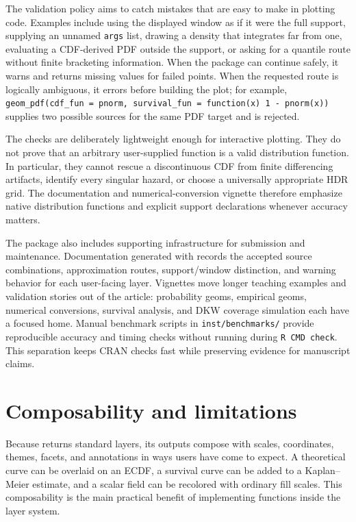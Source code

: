 The validation policy aims to catch mistakes that are easy to make in plotting
code. Examples include using the displayed window as if it were the full
support, supplying an unnamed \texttt{args} list, drawing a density that integrates far
from one, evaluating a CDF-derived PDF outside the support, or asking for a
quantile route without finite bracketing information. When the package can
continue safely, it warns and returns missing values for failed points. When
the requested route is logically ambiguous, it errors before building the plot;
for example, \texttt{geom\_pdf(cdf\_fun\ =\ pnorm,\ survival\_fun\ =\ function(x)\ 1\ -\ pnorm(x))}
supplies two possible sources for the same PDF target and is rejected.

The checks are deliberately lightweight enough for interactive plotting. They
do not prove that an arbitrary user-supplied function is a valid distribution
function. In particular, they cannot rescue a discontinuous CDF from finite
differencing artifacts, identify every singular hazard, or choose a universally
appropriate HDR grid. The documentation and numerical-conversion vignette
therefore emphasize native distribution functions and explicit support
declarations whenever accuracy matters.

The package also includes supporting infrastructure for submission and
maintenance. Documentation generated with  \citep{roxygen2}
records the accepted source combinations, approximation routes, support/window
distinction, and warning behavior for each user-facing layer. Vignettes move
longer teaching examples and validation
stories out of the article: probability geoms, empirical geoms, numerical
conversions, survival analysis, and DKW coverage simulation each have a focused
home. Manual benchmark scripts in \texttt{inst/benchmarks/} provide reproducible
accuracy and timing checks without running during \texttt{R\ CMD\ check}. This separation
keeps CRAN checks fast while preserving evidence for manuscript claims.

\section{Composability and limitations}\label{composability-and-limitations}

Because  returns standard  layers, its outputs
compose with scales, coordinates, themes, facets, and annotations in ways  users have come to expect. A theoretical
curve can be overlaid on an ECDF, a survival curve can be added to a
Kaplan--Meier estimate, and a scalar field can be recolored with ordinary fill
scales. This composability is the main practical benefit of implementing
functions inside the  layer system.

